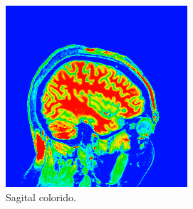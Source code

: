 \documentclass{article}
\begin{document}
\begin{figure}[h]
\begin{subfigure}[b]{0.3\textwidth}
        \includegraphics[width=\textwidth]{brain/neuroradiologist-sagital.png}
        \caption{Sagital colorido.}
    \end{subfigure}
    ~
    \begin{subfigure}[b]{0.3\textwidth}

\end{subfigure}
\end{figure}
\end{document}
